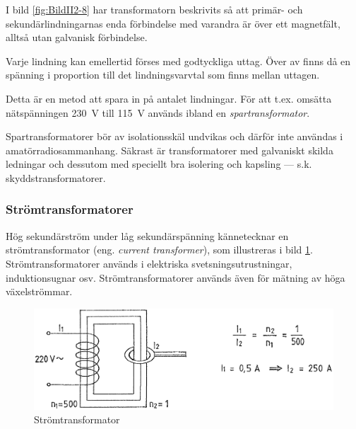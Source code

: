 
I bild \ref{fig:BildII2-8} har transformatorn beskrivits så att primär- och
sekundärlindningarnas enda förbindelse med varandra är över ett magnetfält,
alltså utan galvanisk förbindelse.

Varje lindning kan emellertid förses med godtyckliga uttag. Över av finns då en
spänning i proportion till det lindningsvarvtal som finns mellan uttagen.

Detta är en metod att spara in på antalet lindningar. För att t.ex. omsätta
nätspänningen 230~V till 115~V används ibland en \emph{spartransformator}.

Spartransformatorer bör av isolationsskäl undvikas och därför inte användas i
amatörradiosammanhang. Säkrast är transformatorer med galvaniskt skilda ledningar
och dessutom med speciellt bra isolering och kapsling --- s.k. 
skyddstransformatorer.

\subsubsection{Strömtransformatorer}

Hög sekundärström under låg sekundärspänning kännetecknar en
strömtransformator (eng. \emph{current transformer}),
som illustreras i bild \ref{fig:BildII2-9}.
Strömtransformatorer används i elektriska svetsningsutrustningar,
induktionsugnar osv. Strömtransformatorer används även för mätning av höga
växelströmmar.

\begin{figure}[ht]
\begin{center}
\includegraphics[width=\textwidth]{images/cropped_pdfs/bild_2_2-09.pdf}
\caption{Strömtransformator}
\label{fig:BildII2-9}
\end{center}
\end{figure}

